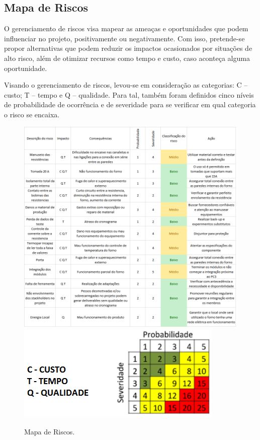 \subsection{Mapa de Riscos}

O gerenciamento de riscos visa mapear as ameaças e oportunidades que podem influenciar no projeto, positivamente ou negativamente. Com isso, pretende-se propor alternativas que podem reduzir os impactos ocasionados por situações de alto risco, além de otimizar recursos como tempo e custo, caso aconteça alguma oportunidade.

Visando o gerenciamento de riscos, levou-se em consideração as categorias: C – custo; T – tempo e Q – qualidade. Para tal, também foram definidos cinco níveis de probabilidade de ocorrência e de severidade para se verificar em qual categoria o risco se encaixa.

\begin{figure}[ht]
	\centering
	\label{risco2}
	\includegraphics[keepaspectratio=true,scale=0.66]{figuras/riscos_tabela.png}
	\includegraphics[keepaspectratio=true,scale=0.55]{figuras/riscos_legenda.png}
	\caption{Mapa de Riscos.}
\end{figure}

